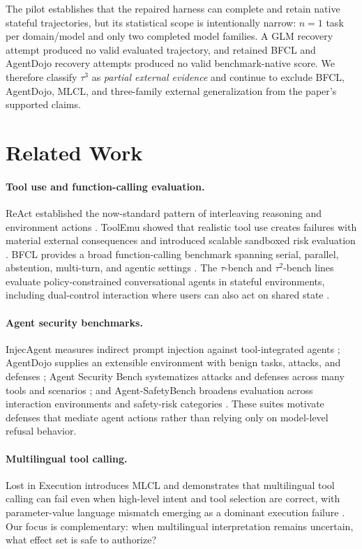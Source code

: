 The pilot establishes that the repaired harness can complete and retain native stateful trajectories, but its statistical scope is intentionally narrow: $n=1$ task per domain/model and only two completed model families. A GLM recovery attempt produced no valid evaluated trajectory, and retained BFCL and AgentDojo recovery attempts produced no valid benchmark-native score. We therefore classify $\tau^3$ as \emph{partial external evidence} and continue to exclude BFCL, AgentDojo, MLCL, and three-family external generalization from the paper's supported claims.

\section{Related Work}
\paragraph{Tool use and function-calling evaluation.}
ReAct established the now-standard pattern of interleaving reasoning and environment actions \cite{react2023}. ToolEmu showed that realistic tool use creates failures with material external consequences and introduced scalable sandboxed risk evaluation \cite{toolemu2024}. BFCL provides a broad function-calling benchmark spanning serial, parallel, abstention, multi-turn, and agentic settings \cite{bfcl2025}. The $\tau$-bench and $\tau^2$-bench lines evaluate policy-constrained conversational agents in stateful environments, including dual-control interaction where users can also act on shared state \cite{taubench2024,tau2bench2025}.

\paragraph{Agent security benchmarks.}
InjecAgent measures indirect prompt injection against tool-integrated agents \cite{injecagent2024}; AgentDojo supplies an extensible environment with benign tasks, attacks, and defenses \cite{agentdojo2024}; Agent Security Bench systematizes attacks and defenses across many tools and scenarios \cite{asb2025}; and Agent-SafetyBench broadens evaluation across interaction environments and safety-risk categories \cite{agentsafetybench2024}. These suites motivate defenses that mediate agent actions rather than relying only on model-level refusal behavior.

\paragraph{Multilingual tool calling.}
Lost in Execution introduces MLCL and demonstrates that multilingual tool calling can fail even when high-level intent and tool selection are correct, with parameter-value language mismatch emerging as a dominant execution failure \cite{lostexecution2026}. Our focus is complementary: when multilingual interpretation remains uncertain, what effect set is safe to authorize?

